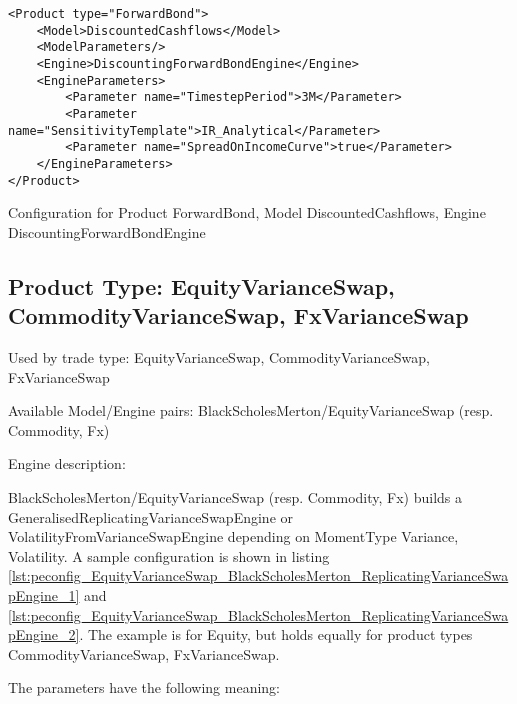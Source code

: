 \begin{longlisting}
\begin{verbatim}
<Product type="ForwardBond">
    <Model>DiscountedCashflows</Model>
    <ModelParameters/>
    <Engine>DiscountingForwardBondEngine</Engine>
    <EngineParameters>
        <Parameter name="TimestepPeriod">3M</Parameter>
        <Parameter name="SensitivityTemplate">IR_Analytical</Parameter>
        <Parameter name="SpreadOnIncomeCurve">true</Parameter>
    </EngineParameters>
</Product>
\end{verbatim}
\caption{Configuration for Product ForwardBond, Model DiscountedCashflows, Engine DiscountingForwardBondEngine}
\label{lst:peconfig_ForwardBond_DiscountedCashflows_DiscountingForwardBondEngine}
\end{longlisting}

\subsection{Product Type: EquityVarianceSwap, CommodityVarianceSwap, FxVarianceSwap}

Used by trade type: EquityVarianceSwap, CommodityVarianceSwap, FxVarianceSwap

Available Model/Engine pairs: BlackScholesMerton/EquityVarianceSwap (resp. Commodity, Fx)

Engine description:

BlackScholesMerton/EquityVarianceSwap (resp. Commodity, Fx) builds a GeneralisedReplicatingVarianceSwapEngine or
VolatilityFromVarianceSwapEngine depending on MomentType Variance, Volatility. A sample configuration is shown in
listing \ref{lst:peconfig_EquityVarianceSwap_BlackScholesMerton_ReplicatingVarianceSwapEngine_1} and
\ref{lst:peconfig_EquityVarianceSwap_BlackScholesMerton_ReplicatingVarianceSwapEngine_2}. The example is for Equity, but
holds equally for product types CommodityVarianceSwap, FxVarianceSwap.

The parameters have the following meaning:

